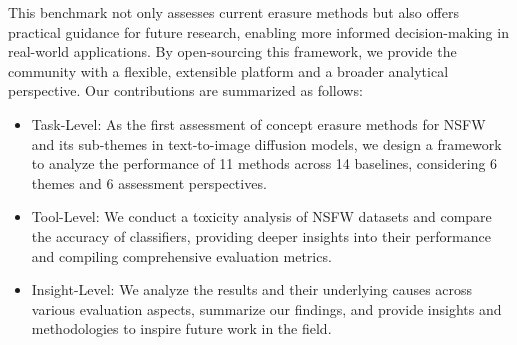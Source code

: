 This benchmark not only assesses current erasure methods but also offers practical guidance for future research, enabling more informed decision-making in real-world applications. By open-sourcing this framework, we provide the community with a flexible, extensible platform and a broader analytical perspective.
Our contributions are summarized as follows:
\begin{itemize}
[itemsep=0pt]
    \item Task-Level: As the first assessment of concept erasure methods for NSFW and its sub-themes in text-to-image diffusion models, we design a framework to analyze the performance of 11 methods across 14 baselines, considering 6 themes and 6 assessment perspectives.
    \item Tool-Level: We conduct a toxicity analysis of NSFW datasets and compare the accuracy of classifiers, providing deeper insights into their performance and compiling comprehensive evaluation metrics.
    \item Insight-Level: We analyze the results and their underlying causes across various evaluation aspects, summarize our findings, and provide insights and methodologies to inspire future work in the field.
\end{itemize}


